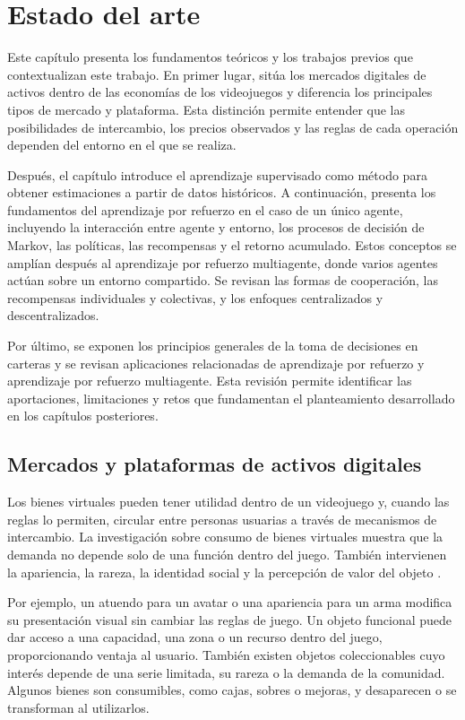 \chapter{Estado del arte}

\noindent Este capítulo presenta los fundamentos teóricos y los trabajos previos que contextualizan este trabajo. En primer lugar, sitúa los mercados digitales de activos dentro de las economías de los videojuegos y diferencia los principales tipos de mercado y plataforma. Esta distinción permite entender que las posibilidades de intercambio, los precios observados y las reglas de cada operación dependen del entorno en el que se realiza.

Después, el capítulo introduce el aprendizaje supervisado como método para obtener estimaciones a partir de datos históricos. A continuación, presenta los fundamentos del aprendizaje por refuerzo en el caso de un único agente, incluyendo la interacción entre agente y entorno, los procesos de decisión de Markov, las políticas, las recompensas y el retorno acumulado. Estos conceptos se amplían después al aprendizaje por refuerzo multiagente, donde varios agentes actúan sobre un entorno compartido. Se revisan las formas de cooperación, las recompensas individuales y colectivas, y los enfoques centralizados y descentralizados.

Por último, se exponen los principios generales de la toma de decisiones en carteras y se revisan aplicaciones relacionadas de aprendizaje por refuerzo y aprendizaje por refuerzo multiagente. Esta revisión permite identificar las aportaciones, limitaciones y retos que fundamentan el planteamiento desarrollado en los capítulos posteriores.

\section{Mercados y plataformas de activos digitales}

Los bienes virtuales pueden tener utilidad dentro de un videojuego y, cuando las reglas lo permiten, circular entre personas usuarias a través de mecanismos de intercambio. La investigación sobre consumo de bienes virtuales muestra que la demanda no depende solo de una función dentro del juego. También intervienen la apariencia, la rareza, la identidad social y la percepción de valor del objeto \cite{lehdonvirta2009virtual,guo2009virtual}.

Por ejemplo, un atuendo para un avatar o una apariencia para un arma modifica su presentación visual sin cambiar las reglas de juego. Un objeto funcional puede dar acceso a una capacidad, una zona o un recurso dentro del juego, proporcionando ventaja al usuario. También existen objetos coleccionables cuyo interés depende de una serie limitada, su rareza o la demanda de la comunidad. Algunos bienes son consumibles, como cajas, sobres o mejoras, y desaparecen o se transforman al utilizarlos.


